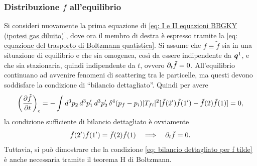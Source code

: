 \subsubsection{Distribuzione $f$ all'equilibrio}
Si consideri nuovamente la prima equazione di \eqref{eq: I e II equazioni BBGKY (ipotesi gas diluito)}, dove ora il membro di destra è espresso tramite la \eqref{eq: equazione del trasporto di Boltzmann quatistica}. Si assume che $f \equiv \tilde{f}$ sia in una situazione di equilibrio e che sia omogenea, così da essere indipendente da $\bm{q}^1$, e che sia stazionaria, quindi indipendente da $t$, ovvero $\partial_t\tilde{f} = 0$. All'equilibrio continuano ad avvenire fenomeni di scattering tra le particelle, ma questi devono soddisfare la condizione di ``bilancio dettagliato''. Quindi per avere
\begin{equation}
    \bigg(\frac{\partial \tilde{f}}{\partial t}\bigg)_c = -\int d^3p_2\,d^3p_1'\,d^3p_2'\,\delta^4(p_f - p_i)|T_{fi}|^2[\tilde{f}(2')\tilde{f}(1') - \tilde{f}(2)\tilde{f}(1)] = 0,
\end{equation}
la condizione sufficiente di bilancio dettagliato è ovviamente
\begin{equation}
\label{eq: bilancio dettagliato per f tilde}
    \tilde{f}(2')\tilde{f}(1') = \tilde{f}(2)\tilde{f}(1)\quad\Longrightarrow\quad \partial_t\tilde{f} = 0.
\end{equation}
Tuttavia, si può dimostrare che la condizione \eqref{eq: bilancio dettagliato per f tilde} è anche necessaria tramite il teorema H di Boltzmann.

